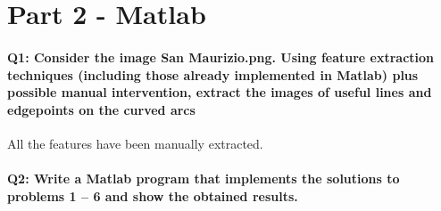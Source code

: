\documentclass[a4paper,11pt]{article}
\begin{document}
\section*{Part 2 - Matlab}


\paragraph{Q1: Consider the image San Maurizio.png. Using feature extraction techniques (including those
already implemented in Matlab) plus possible manual intervention, extract the images of
useful lines and edgepoints on the curved arcs} 
All the features have been manually extracted.

\paragraph{Q2: Write a Matlab program that implements the solutions to problems 1 – 6 and show the
obtained results.}
\end{document}
